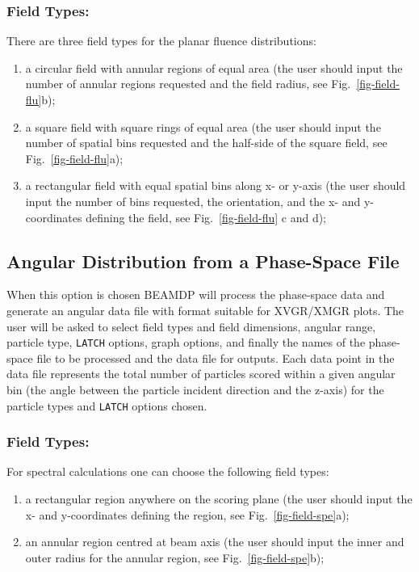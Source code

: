 \documentclass[12pt,twoside]{article}
\begin{document}
\subsubsection{Field Types:}

There are three field types for the planar fluence distributions:

\begin{enumerate}
\item a circular field with annular regions of equal area (the user should
input the number of annular regions requested and the field radius, see
Fig.~\ref{fig-field-flu}b);

\item a square field with square rings of equal area (the user should
input the number of spatial bins requested and the half-side of the square
field, see Fig.~\ref{fig-field-flu}a);

\item a rectangular field with equal spatial bins along x- or y-axis (the
user should input the number of bins requested, the orientation, and the
x- and y-coordinates defining the field, see Fig.~\ref{fig-field-flu} c
and d); \end{enumerate}

\subsection{Angular Distribution from a Phase-Space File}
When this option is chosen BEAMDP will process the phase-space data and
generate an angular data file with format suitable for XVGR/XMGR plots.
The user will be asked to select field types and field dimensions, angular
range, particle type, \verb+LATCH+ options, graph options, and finally the
names of the phase-space file to be processed and the data file for
outputs.  Each data point in the data file represents the total number of
particles scored within a given angular bin (the angle between the
particle incident direction and the z-axis) for the particle types and
\verb+LATCH+ options chosen.


\subsubsection{Field Types:}
For spectral calculations one can choose the following field types:
\begin{enumerate}
\item a rectangular region anywhere on the scoring plane (the user should
input the  x- and y-coordinates defining the region, see
Fig.~\ref{fig-field-spe}a);

\item an annular region centred at beam axis (the user should input the
inner and outer radius for the annular region, see
Fig.~\ref{fig-field-spe}b);

\end{enumerate}
\end{document}
